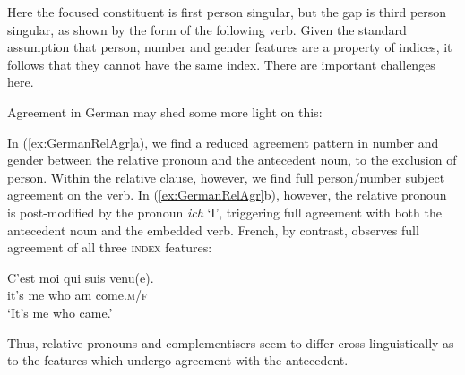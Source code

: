 \documentclass[output=paper
                ,modfonts
                ,nonflat
	        ,collection
	        ,collectionchapter
	        ,collectiontoclongg
 	        ,biblatex
                ,babelshorthands
                ,newtxmath
                ,draftmode
                ,colorlinks, citecolor=brown
]{./langsci/langscibook}
\begin{document}
{\noindent
Here the focused constituent is first person singular, but the gap is
third person singular, as shown by the form of the following verb. Given
the standard assumption that person, number and gender features are a
property of indices, it follows that they cannot have the same index.
There are important challenges here.

Agreement in German may shed some more light on this: 

\begin{exe}
\ex \label{ex:GermanRelAgr}
\begin{xlist}
\end{xlist}
\end{exe}

\noindent 
In (\ref{ex:GermanRelAgr}a), we find a reduced agreement pattern in
number and gender between the relative pronoun and the antecedent
noun, to the exclusion of person. Within the relative clause, however, we find full person/number subject agreement on the verb. In (\ref{ex:GermanRelAgr}b), however, the relative pronoun is post-modified by the pronoun \textit{ich} `I', triggering full  agreement with both the antecedent noun and the embedded verb. 
French, by contrast, observes full agreement of all three \textsc{index} features: 

\begin{exe}
 \ex \label{ex:FrenchRelSAgr} \gll C'est moi qui suis venu(e).\\
  it's me who am come.\textsc{m/f}\\
\glt `It's me who came.' 
\end{exe}
 
\noindent
Thus, relative pronouns and complementisers seem to differ cross-linguistically as to the features which undergo agreement with the antecedent.  

}
\end{document}
